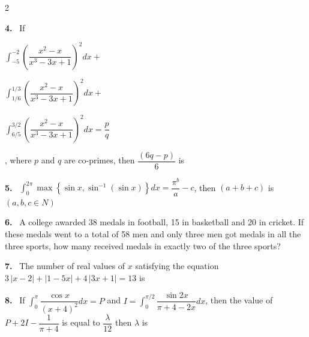 \documentclass[10pt]{extarticle}
\newcommand{\qn}[1]{\par\smallskip\noindent\textbf{#1.}~}
\begin{document}
\begin{multicols}{2}
\qn{4} If \par\smallskip\noindent$\displaystyle\int_{-5}^{-2}\left(\dfrac{x^2-x}{x^3-3x+1}\right)^2dx+{}$\par\noindent$\displaystyle\int_{1/6}^{1/3}\left(\dfrac{x^2-x}{x^3-3x+1}\right)^2dx+{}$\par\noindent$\displaystyle\int_{6/5}^{3/2}\left(\dfrac{x^2-x}{x^3-3x+1}\right)^2dx=\dfrac pq$\par\smallskip\noindent, where $p$ and $q$ are co-primes, then $\dfrac{(6q-p)}6$ is
\qn{5} $\displaystyle\int_0^{2\pi}\max\left\{\sin x,\sin^{-1}(\sin x)\right\}dx=\dfrac{\pi^b}a-c$, then $(a+b+c)$ is $(a,b,c\in N)$
\qn{6} A college awarded 38 medals in football, 15 in basketball and 20 in cricket. If these medals went to a total of 58 men and only three men got medals in all the three sports, how many received medals in exactly two of the three sports?
\qn{7} The number of real values of $x$ satisfying the equation $3\,|x-2|+|1-5x|+4\,|3x+1|=13$ is
\qn{8} If $\displaystyle\int_0^\pi\dfrac{\cos x}{(x+4)^2}dx=P$ and $I=\displaystyle\int_0^{\pi/2}\dfrac{\sin2x}{\pi+4-2x}dx$, then the value of $P+2I-\dfrac1{\pi+4}$ is equal to $\dfrac\lambda{12}$ then $\lambda$ is
\end{multicols}
\end{document}
